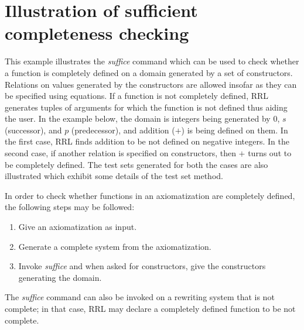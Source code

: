\chapter{Illustration of sufficient completeness checking} 
\normalsize 
\rm 
This example illustrates the {\em
suffice} command which can be used to check whether a function is
completely defined on a domain generated by a set of constructors.
Relations on values generated by the constructors are allowed insofar
as they can be specified using equations.  If a function is not
completely defined, RRL generates tuples of arguments for which the
function is not defined thus aiding the user. In the example below,
the domain is integers being generated by $0$, $s$ (successor), and
$p$ (predecessor), and addition ($+$) is being defined on them. In the
first case, RRL finds addition to be not defined on negative integers.
In the second case, if another relation is specified on constructors,
then $+$ turns out to be completely defined. The test sets generated
for both the cases are also illustrated which exhibit some details of
the test set method.

In order to check whether functions in an axiomatization are completely
defined, the following steps may be followed:
\begin{enumerate}
\item Give an axiomatization as input.
\item Generate a complete system from the axiomatization.
\item Invoke {\em suffice} and when asked for constructors, give
the constructors generating the domain.
\end{enumerate}
The {\em suffice} command can also be invoked on a rewriting system
that is not complete; in that case, RRL may declare a completely
defined function to be not complete.

